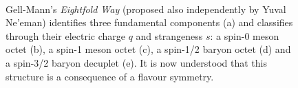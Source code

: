 \begin{figure}[h!tb]\begin{center}
	\\
	\caption{Gell-Mann's \textit{Eightfold Way} (proposed also independently 
          by Yuval Ne'eman) identifies three fundamental components (a) 
          and classifies through their electric charge $q$ and strangeness $s$:
          a spin-0 meson octet (b), a spin-1 meson octet (c), 
          a spin-1/2 baryon octet (d) and a spin-3/2 baryon decuplet (e).
          It is now understood that this structure is a 
          consequence of a flavour symmetry.\label{fig:eightfold}}
\end{center}\end{figure}

